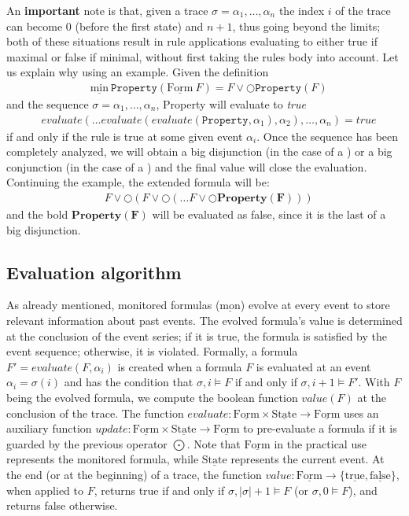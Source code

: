 \documentclass[english]{article}
\begin{document}
An \textbf{important} note is that, given a trace $\sigma=\alpha_{1},\ldots ,\alpha_{n}$ the index $i$ of the trace can become $0$ (before the first state) and $n+1$, thus going beyond the limits; both of these situations result in rule applications evaluating to either true if maximal or false if minimal, without first taking the rules body into account. Let us explain why using an example. Given the definition 
\begin{align*}
    & \underline{\text{min}}\ \mathtt{Property}(\underline{\text{Form}}\ F) =F \lor \bigcirc \mathtt{Property}(F)
\end{align*}
and the sequence $\sigma=\alpha_{1},\ldots ,\alpha_{n}$, Property will evaluate to \textit{true} 
\begin{align*}
    & evaluate(\ldots evaluate(evaluate(\mathtt{Property},\alpha_1),\alpha_2),\ldots,\alpha_n)=true
\end{align*}
if and only if the rule is true at some given event $\alpha_i$. 
Once the sequence has been completely analyzed, we will obtain a big disjunction (in the case of a \underline{}) or a big conjunction (in the case of a \underline{}) and the final value will close the evaluation. Continuing the example, the extended formula will be:
\begin{align*}
    & F \lor \bigcirc(F \lor \bigcirc(\ldots F \lor \bigcirc \mathbf{Property(F)})) 
\end{align*}
and the bold $\mathbf{Property(F)}$ will be evaluated as false, since it is the last of a big disjunction.
\subsection{Evaluation algorithm}\label{algo}
As already mentioned, monitored formulas ($\underline{\text{mon}}$) evolve at every event to store relevant information about past events. The evolved formula's value is determined at the conclusion of the event series; if it is true, the formula is satisfied by the event sequence; otherwise, it is violated. Formally, a formula $F' = evaluate(F, \alpha_i)$ is created when a formula $F$ is evaluated at an event $\alpha_i = \sigma(i)$ and has the condition that $\sigma, i \models F$ if and only if $\sigma, i+1 \models F'$. With $F$ being the evolved formula, we compute the boolean function $value(F)$ at the conclusion of the trace. The function $evaluate: \underline{\text{Form}} \times \underline{\text{State}} \to \underline{\text{Form}}$ uses an auxiliary function $update: \underline{\text{Form}} \times \underline{\text{State}} \to \underline{\text{Form}}$ to pre-evaluate a formula if it is guarded by the previous operator $\bigodot$. Note that $\underline{\text{Form}}$ in the practical use represents the monitored formula, while $\underline{\text{State}}$ represents the current event. At the end (or at the beginning) of a trace, the
function $value : \underline{\text{Form}} \rightarrow \{ \underline{\text{true}}, \underline{\text{false}} \}$, when applied to $F$, returns true if and only if $\sigma,|\sigma|+1 \models F$ (or $\sigma,0 \models F$), and returns false otherwise.
\end{document}
